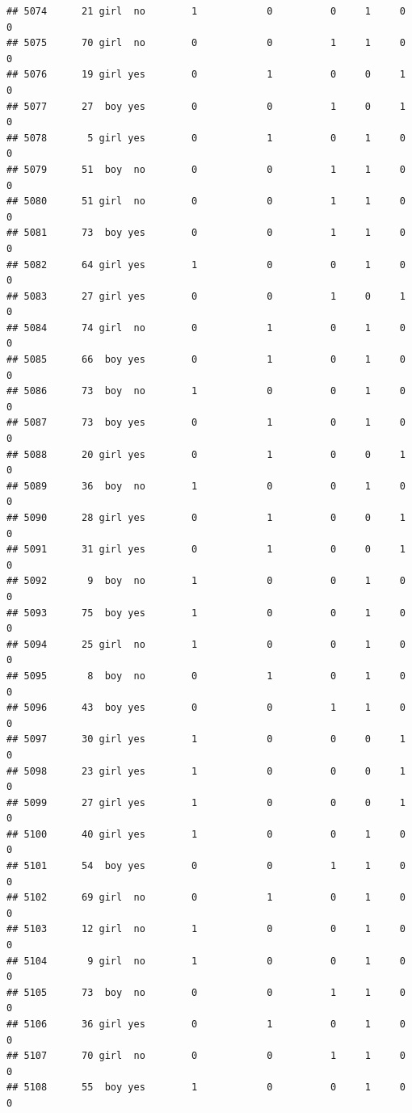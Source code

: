 \documentclass[man]{apa6}
\begin{document}
\begin{verbatim}
## 5074      21 girl  no        1            0          0     1     0     0
## 5075      70 girl  no        0            0          1     1     0     0
## 5076      19 girl yes        0            1          0     0     1     0
## 5077      27  boy yes        0            0          1     0     1     0
## 5078       5 girl yes        0            1          0     1     0     0
## 5079      51  boy  no        0            0          1     1     0     0
## 5080      51 girl  no        0            0          1     1     0     0
## 5081      73  boy yes        0            0          1     1     0     0
## 5082      64 girl yes        1            0          0     1     0     0
## 5083      27 girl yes        0            0          1     0     1     0
## 5084      74 girl  no        0            1          0     1     0     0
## 5085      66  boy yes        0            1          0     1     0     0
## 5086      73  boy  no        1            0          0     1     0     0
## 5087      73  boy yes        0            1          0     1     0     0
## 5088      20 girl yes        0            1          0     0     1     0
## 5089      36  boy  no        1            0          0     1     0     0
## 5090      28 girl yes        0            1          0     0     1     0
## 5091      31 girl yes        0            1          0     0     1     0
## 5092       9  boy  no        1            0          0     1     0     0
## 5093      75  boy yes        1            0          0     1     0     0
## 5094      25 girl  no        1            0          0     1     0     0
## 5095       8  boy  no        0            1          0     1     0     0
## 5096      43  boy yes        0            0          1     1     0     0
## 5097      30 girl yes        1            0          0     0     1     0
## 5098      23 girl yes        1            0          0     0     1     0
## 5099      27 girl yes        1            0          0     0     1     0
## 5100      40 girl yes        1            0          0     1     0     0
## 5101      54  boy yes        0            0          1     1     0     0
## 5102      69 girl  no        0            1          0     1     0     0
## 5103      12 girl  no        1            0          0     1     0     0
## 5104       9 girl  no        1            0          0     1     0     0
## 5105      73  boy  no        0            0          1     1     0     0
## 5106      36 girl yes        0            1          0     1     0     0
## 5107      70 girl  no        0            0          1     1     0     0
## 5108      55  boy yes        1            0          0     1     0     0

\end{verbatim}
\end{document}
